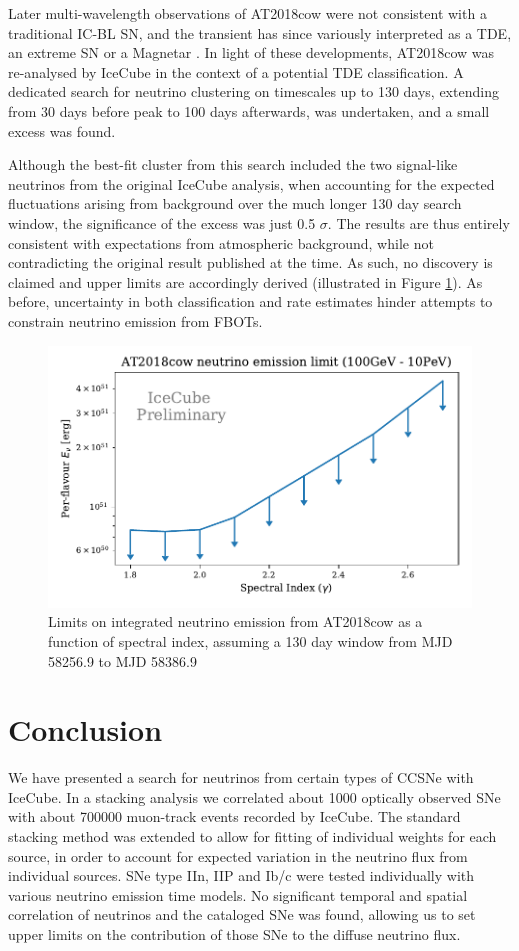 \documentclass[twocolumn, tighten, linenumbers]{aastex62}
\begin{document}
Later multi-wavelength observations of AT2018cow were not consistent with a traditional IC-BL SN, and the transient has since variously interpreted as a TDE, an extreme SN or a Magnetar \cite{Perley:2018oky}. In light of these developments, AT2018cow was re-analysed by IceCube in the context of a potential TDE classification. A dedicated search for neutrino clustering on timescales up to 130 days, extending from 30 days before peak to 100 days afterwards, was undertaken, and a small excess was found.

Although the best-fit cluster from this search included the two signal-like neutrinos from the original IceCube analysis, when accounting for the expected fluctuations arising from background over the much longer 130 day search window, the significance of the excess was just 0.5 $\sigma$. The results are thus entirely consistent with expectations from atmospheric background, while not contradicting the original result published at the time. As such, no discovery is claimed and upper limits are accordingly derived (illustrated in Figure \ref{fig:At2018cow}). As before, uncertainty in both classification and rate estimates hinder attempts to constrain neutrino emission from FBOTs.

\begin{figure}[!ht]
	\centering \includegraphics[width=.45\textwidth]{figures/AT2018cow_limit_plot}
	\caption{Limits on integrated neutrino emission from AT2018cow as a function of spectral index, assuming a 130 day window from MJD 58256.9 to MJD 58386.9}
	\label{fig:At2018cow}
\end{figure}



\section{Conclusion}
\label{sec:Conclusion}
We have presented a search for neutrinos from certain types of CCSNe with IceCube. In a stacking analysis we correlated about 1000 optically observed SNe with about 700000 muon-track events recorded by IceCube. The standard stacking method was extended to allow for fitting of individual weights for each source, in order to account for expected variation in the neutrino flux from individual sources.
SNe type IIn, IIP and Ib/c were tested individually with various neutrino emission time models. No significant temporal and spatial correlation of neutrinos and the cataloged SNe was found, allowing us to set upper limits on the contribution of those SNe to the diffuse neutrino flux. 
\end{document}
